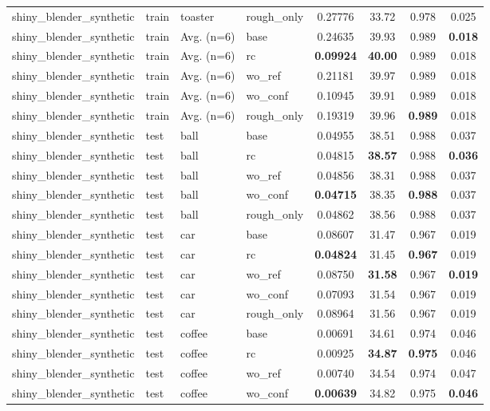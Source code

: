 \begin{table}[t]
{\begin{tabular}{llllcccc}
shiny\_blender\_synthetic & train & toaster & rough\_only & 0.27776 & 33.72 & 0.978 & 0.025 \\
shiny\_blender\_synthetic & train & Avg. (n=6) & base & 0.24635 & 39.93 & 0.989 & \textbf{0.018} \\
shiny\_blender\_synthetic & train & Avg. (n=6) & rc & \textbf{0.09924} & \textbf{40.00} & 0.989 & 0.018 \\
shiny\_blender\_synthetic & train & Avg. (n=6) & wo\_ref & 0.21181 & 39.97 & 0.989 & 0.018 \\
shiny\_blender\_synthetic & train & Avg. (n=6) & wo\_conf & 0.10945 & 39.91 & 0.989 & 0.018 \\
shiny\_blender\_synthetic & train & Avg. (n=6) & rough\_only & 0.19319 & 39.96 & \textbf{0.989} & 0.018 \\
\midrule
shiny\_blender\_synthetic & test & ball & base & 0.04955 & 38.51 & 0.988 & 0.037 \\
shiny\_blender\_synthetic & test & ball & rc & 0.04815 & \textbf{38.57} & 0.988 & \textbf{0.036} \\
shiny\_blender\_synthetic & test & ball & wo\_ref & 0.04856 & 38.31 & 0.988 & 0.037 \\
shiny\_blender\_synthetic & test & ball & wo\_conf & \textbf{0.04715} & 38.35 & \textbf{0.988} & 0.037 \\
shiny\_blender\_synthetic & test & ball & rough\_only & 0.04862 & 38.56 & 0.988 & 0.037 \\
shiny\_blender\_synthetic & test & car & base & 0.08607 & 31.47 & 0.967 & 0.019 \\
shiny\_blender\_synthetic & test & car & rc & \textbf{0.04824} & 31.45 & \textbf{0.967} & 0.019 \\
shiny\_blender\_synthetic & test & car & wo\_ref & 0.08750 & \textbf{31.58} & 0.967 & \textbf{0.019} \\
shiny\_blender\_synthetic & test & car & wo\_conf & 0.07093 & 31.54 & 0.967 & 0.019 \\
shiny\_blender\_synthetic & test & car & rough\_only & 0.08964 & 31.56 & 0.967 & 0.019 \\
shiny\_blender\_synthetic & test & coffee & base & 0.00691 & 34.61 & 0.974 & 0.046 \\
shiny\_blender\_synthetic & test & coffee & rc & 0.00925 & \textbf{34.87} & \textbf{0.975} & 0.046 \\
shiny\_blender\_synthetic & test & coffee & wo\_ref & 0.00740 & 34.54 & 0.974 & 0.047 \\
shiny\_blender\_synthetic & test & coffee & wo\_conf & \textbf{0.00639} & 34.82 & 0.975 & \textbf{0.046} \\

\end{tabular}}
\end{table}

